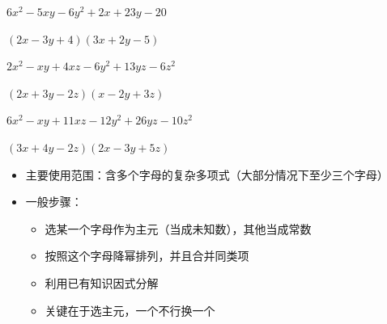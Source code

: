 \documentclass[windows,csize4,answers]{BHCexam}
\begin{document}
\begin{groups}
\begin{questions}[]
\begin{multicols}{2}
            \question[5]$6x^2-5xy-6y^2+2x+23y-20$
            \begin{solution}{0.5cm}
                \methodonly $(2x-3y+4)(3x+2y-5)$
            \end{solution}
        \end{multicols}
        \vspace{3.5cm}

        \begin{multicols}{2}
            \question[5]$2 x^2-x y+4 x z-6 y^2+13 y z-6 z^2$
            \begin{solution}{0.5cm}
                \methodonly $(2 x+3 y-2 z) (x-2 y+3 z)$
            \end{solution}

            \question[5]$6 x^2-x y+11 x z-12 y^2+26 y z-10 z^2$
            \begin{solution}{0.5cm}
                \methodonly $(3 x+4 y-2 z) (2 x-3 y+5 z)$
            \end{solution}
        \end{multicols}
        \vspace{3.5cm}

    \end{questions}
\end{groups}

\begin{groups}
    \begin{itemize}
        \item 主要使用范围：含多个字母的复杂多项式（大部分情况下至少三个字母）
        \item 一般步骤：
              \begin{itemize}
                  \item 选某一个字母作为主元（当成未知数），其他当成常数
                  \item 按照这个字母降幂排列，并且合并同类项
                  \item 利用已有知识因式分解
                  \item 关键在于选主元，一个不行换一个
              \end{itemize}
    \end{itemize}
\end{groups}
\end{document}
